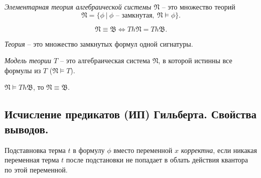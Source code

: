 \begin{definition}
    \emph{Элементарная теория алгебраической системы $ \mathfrak{N} $} -- это множество теорий
    \[
        \mathfrak{N} = \big\{\phi \ \big| \ \phi \text{ -- замкнутая}, \ \mathfrak{N}\vDash \phi\big\}.
    \]
\end{definition}

\begin{remark}
    \[
        \mathfrak{N} \equiv \mathfrak{B} \iff Th \mathfrak{N} = Th \mathfrak{B}.
    \]
\end{remark}

\begin{definition}[Теория]
    \emph{Теория} -- это множество замкнутых формул одной сигнатуры.
\end{definition}

\begin{definition}
    \emph{Модель теории $ T $} -- это алгебраическая система $ \mathfrak{N} $, в которой истинны все формулы из $ T $ ($ \mathfrak{N} \vDash T $).
\end{definition}

\begin{note}
    $ \mathfrak{N} \vDash Th \mathfrak{B} $, то $ \mathfrak{N} \equiv \mathfrak{B} $.
\end{note}

\subsection{Исчисление предикатов (ИП) Гильберта. Свойства выводов.}

\begin{definition}
    Подставновка терма $ t $ в формулу $ \phi $ вместо переменной $ x $ \emph{корректна}, если никакая переменная терма $ t $ после подстановки не попадает в облать действия квантора по этой переменной.
\end{definition}

